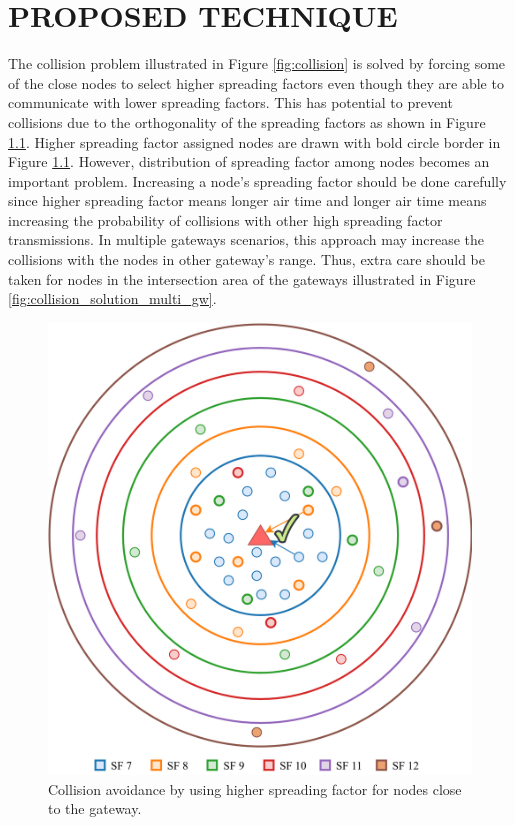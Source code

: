 \chapter{PROPOSED TECHNIQUE}\label{ch:proposed_technique}

The collision problem illustrated in Figure \ref{fig:collision} is solved by forcing some of the close nodes to select higher spreading factors even though they are able to communicate with lower spreading factors. This has potential to prevent collisions due to the orthogonality of the spreading factors as shown in Figure \ref{fig:collision_solution_single_gw}. Higher spreading factor assigned nodes are drawn with bold circle border in Figure \ref{fig:collision_solution_single_gw}. However, distribution of spreading factor among nodes becomes an important problem. Increasing a node's spreading factor should be done carefully since higher spreading factor means longer air time and longer air time means increasing the probability of collisions with other high spreading factor transmissions. In multiple gateways scenarios, this approach may increase the collisions with the nodes in other gateway's range. Thus, extra care should be taken for nodes in the intersection area of the gateways illustrated in Figure \ref{fig:collision_solution_multi_gw}.

\begin{figure}
\centering
\includegraphics[width=.7\linewidth]{fig/lora_single_gw_collision_fix.png}
\vspace*{5mm}
\caption{Collision avoidance by using higher spreading factor for nodes close to the gateway.}
\label{fig:collision_solution_single_gw}
\end{figure}

